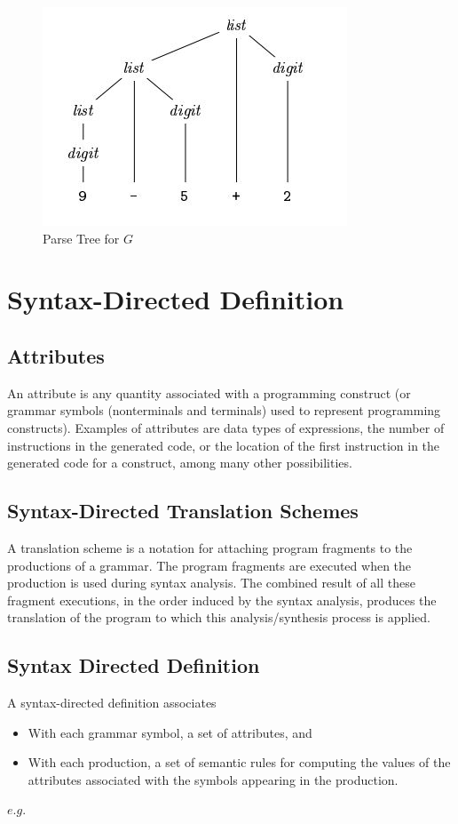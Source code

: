\documentclass[12pt]{article}
\begin{document}
	\begin{figure}[h!]
		\begin{center}\includegraphics[scale=1]{parseTree.jpg}\end{center}
		\caption{Parse Tree for $G$}
  		\label{fig:parsetree1}
	\end{figure}


\section{Syntax-Directed Definition}
	\subsection{Attributes}
		An attribute is any quantity associated with a programming construct (or grammar symbols (nonterminals and terminals) used to represent programming constructs). Examples of attributes are data types of expressions, the number of instructions in the generated code, or the location of the first instruction in the generated code for a construct, among many other possibilities.
	\subsection{Syntax-Directed Translation Schemes}
		A translation scheme is a notation for attaching program fragments to the productions of a grammar. The program fragments are executed when the production is used during syntax analysis. The combined result of all these fragment executions, in the order induced by the syntax analysis, produces the translation of the program to which this analysis/synthesis process is applied.

	\subsection{Syntax Directed Definition}
		A syntax-directed definition associates
		\begin{itemize}
			\item With each grammar symbol, a set of attributes, and
			\item With each production, a set of semantic rules for computing the values of the attributes associated with the symbols appearing in the production.
		\end{itemize}
		\newpage
		$e.g.$
\end{document}
